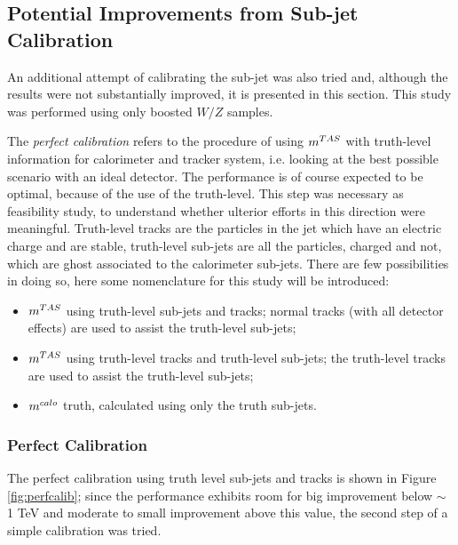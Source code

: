 \subsection{Potential Improvements from Sub-jet Calibration}

An additional attempt of calibrating the sub-jet was also tried and, although the results were not substantially improved, it is presented in this section. This study was performed using only boosted $W/Z$ samples.

The \textit{perfect calibration} refers to the procedure of using $m^{TAS}$ with truth-level information for calorimeter and tracker system, i.e. looking at the best possible scenario with an ideal detector. The performance is of course expected to be optimal, because of the use of the truth-level. This step was necessary as feasibility study, to understand whether ulterior efforts in this direction were meaningful.
Truth-level tracks are the particles in the jet which have an electric charge and are stable, truth-level sub-jets are all the particles, charged and not, which are ghost associated to the calorimeter sub-jets.
There are few possibilities in doing so, here some nomenclature for this study will be introduced:
\begin{itemize}
 \item $m^{TAS}$ using truth-level sub-jets and tracks; normal tracks (with all detector effects) are used to assist the truth-level sub-jets;
 \item $m^{TAS}$ using truth-level tracks and truth-level sub-jets; the truth-level tracks are used to assist the truth-level sub-jets;
 \item $m^{calo}$ truth, calculated using only the truth sub-jets.
\end{itemize}


\subsubsection{Perfect Calibration}

The perfect calibration using truth level sub-jets and tracks is shown in Figure \ref{fig:perfcalib}; since the performance exhibits room for big improvement below $\sim$ 1 TeV and moderate to small improvement above this value, the second step of a simple calibration was tried.

